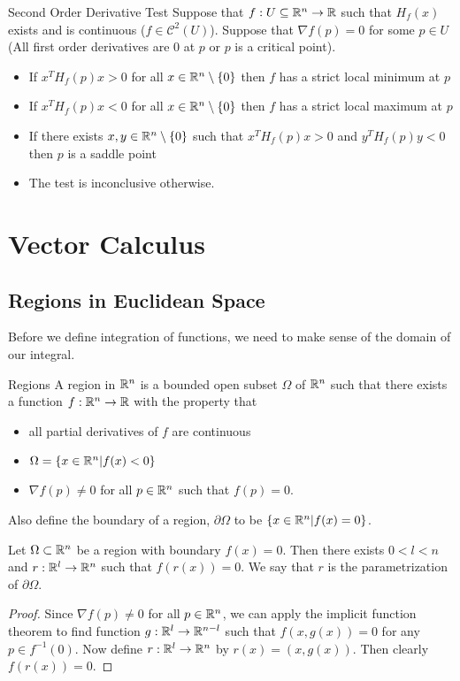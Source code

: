 \documentclass[a4paper]{article}
\begin{document}
\begin{thm}{Second Order Derivative Test}{} Suppose that $f:U\subseteq\mathbb{R}^n\to\mathbb{R}$ such that $H_f(x)$ exists and is continuous ($f\in\mathcal{C}^2(U)$). Suppose that $\nabla f(p)=0$ for some $p\in U$ (All first order derivatives are $0$ at $p$ or $p$ is a critical point). 
\begin{itemize}
\item If $x^TH_f(p)x>0$ for all $x\in\mathbb{R}^n\setminus\{0\}$ then $f$ has a strict local minimum at $p$
\item If $x^TH_f(p)x<0$ for all $x\in\mathbb{R}^n\setminus\{0\}$ then $f$ has a strict local maximum at $p$
\item If there exists $x,y\in\mathbb{R}^n\setminus\{0\}$ such that $x^TH_f(p)x>0$ and $y^TH_f(p)y<0$ then $p$ is a saddle point
\item The test is inconclusive otherwise. 
\end{itemize}
\end{thm}

\pagebreak
\section{Vector Calculus}
\subsection{Regions in Euclidean Space}
Before we define integration of functions, we need to make sense of the domain of our integral. 

\begin{defn}{Regions}{} A region in $\mathbb{R}^n$ is a bounded open subset $\Omega$ of $\mathbb{R}^n$ such that there exists a function $f:\mathbb{R}^n\to\mathbb{R}$ with the property that 
\begin{itemize}
\item all partial derivatives of $f$ are continuous
\item $\Omega=\{x\in\mathbb{R}^n|f(x)<0\}$
\item $\nabla f(p)\neq 0$ for all $p\in\mathbb{R}^n$ such that $f(p)=0$. 
\end{itemize}
Also define the boundary of a region, $\partial\Omega$ to be $\{x\in\mathbb{R}^n|f(x)=0\}$. 
\end{defn}

\begin{prp}{}{} Let $\Omega\subset\mathbb{R}^n$ be a region with boundary $f(x)=0$. Then there exists $0<l<n$ and $r:\mathbb{R}^l\to\mathbb{R}^n$ such that $f(r(x))=0$. We say that $r$ is the parametrization of $\partial\Omega$. 
\begin{proof}
Since $\nabla f(p)\neq 0$ for all $p\in\mathbb{R}^n$, we can apply the implicit function theorem to find function $g:\mathbb{R}^l\to\mathbb{R}^{n-l}$ such that $f(x,g(x))=0$ for any $p\in f^{-1}(0)$. Now define $r:\mathbb{R}^l\to\mathbb{R}^n$ by $r(x)=(x,g(x))$. Then clearly $f(r(x))=0$. 
\end{proof}
\end{prp}
\end{document}
